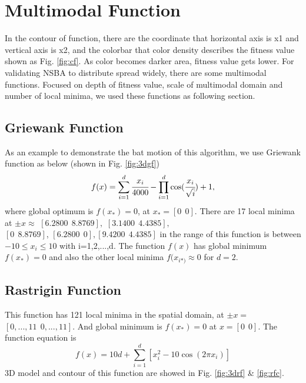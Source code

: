 \section{Multimodal Function}
 In the contour of function, there are the coordinate that horizontal axis is x1 and vertical axis is x2, and the colorbar that color density describes the fitness value shown as Fig. \ref{fig:cf}. As color becomes darker area, fitness value gets lower. For validating NSBA to distribute spread widely, there are some multimodal functions. Focused on depth of fitness value, scale of multimodal domain and number of local minima, we used these functions as following section.  
\subsection{Griewank Function}
As an example to demonstrate the bat motion of this algorithm, we use Griewank function as below (shown in Fig. \ref{fig:3dgf})
\begin{equation}
f(x)= \sum_{i=1}^d \cfrac{x_{i}}{4000} - \prod_{i=1}^d \cos(\cfrac{x_i}{\sqrt{i}}) + 1,
\end{equation}
where global optimum is ${f(x_*)}=0$, at $x_* = {[0 \ \ 0]}$. There are 17 local minima at ${\pm x \approx}$ ${ [6.2800 \ \ 8.8769],}$ ${[3.1400 \ \ 4.4385],}$ \\ ${[0 \ \ 8.8769]}$, ${[6.2800 \ \ 0], [9.4200 \ \ 4.4385]}$ in the range of this function is between ${-10 \leq x_i \leq 10}$ with i=1,2,...,d. The function ${f(x)}$ has global minimum ${f(x_*)}=0$ and also the other local minima ${f(x_{i*)} \approx 0}$  for ${d=2}$.  

 \subsection{Rastrigin Function}
 This function has 121 local minima in the spatial domain, at ${ \pm x=}$ ${[0,...,11 \ \ 0,...,11]}$. And global minimum is ${f(x_*)=0}$ at ${x=[0 \ \ 0]}$. The function equation is
 \begin{equation}
f(x)= 10d+\sum_{i=1}^d [x_i^2-10 \cos(2\pi x_i)]
\end{equation}
3D model and contour of this function are showed in Fig. \ref{fig:3drf} \& \ref{fig:rfc}. 


